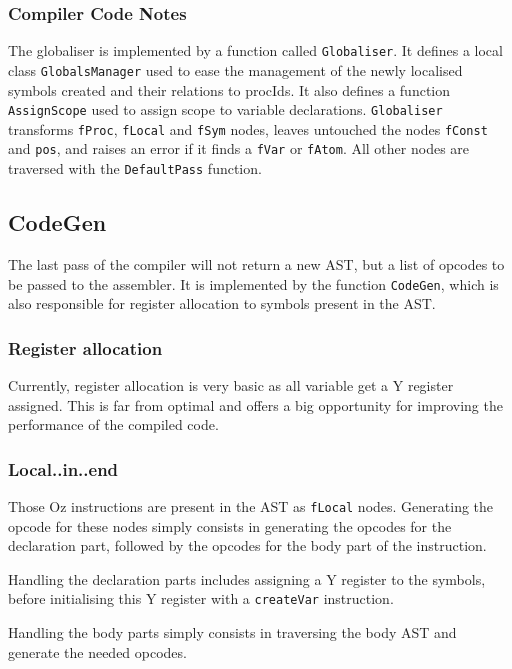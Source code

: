 \documentclass[a4paper]{memoir}
\begin{document}
\subsubsection{Compiler Code Notes}
The globaliser is implemented by a function called \lstinline!Globaliser!. It defines a local class \lstinline!GlobalsManager! used to ease the management of the newly localised symbols created and their relations to procIds. It also defines a function \lstinline!AssignScope! used to assign scope to variable declarations. \lstinline!Globaliser! transforms \lstinline!fProc!, \lstinline!fLocal! and \lstinline!fSym! nodes, leaves untouched the nodes \lstinline!fConst! and \lstinline!pos!, and raises an error if it finds a \lstinline!fVar! or \lstinline!fAtom!. All other nodes are traversed with the \lstinline!DefaultPass! function.

\subsection{CodeGen}\label{sec:arch:codegen}
The last pass of the compiler will not return a new AST, but a list of opcodes to be passed to the assembler. It is implemented by the function \lstinline!CodeGen!, which is also responsible for register allocation to symbols present in the AST.

\subsubsection{Register allocation}
Currently, register allocation is very basic as all variable get a Y register assigned. This is far from optimal and offers a big opportunity for improving the performance of the compiled code.

\subsubsection{Local..in..end}\label{sec:arch:codegen:localin}
Those Oz instructions are present in the AST as \lstinline!fLocal! nodes.
Generating the opcode for these nodes simply consists in generating the opcodes
for the declaration part, followed by the opcodes for the body part of the
instruction.

Handling the declaration parts includes assigning a Y register to the symbols,
before initialising this Y register with a \lstinline!createVar! instruction.

Handling the body parts simply consists in traversing the body AST and generate
the needed opcodes.
\end{document}
